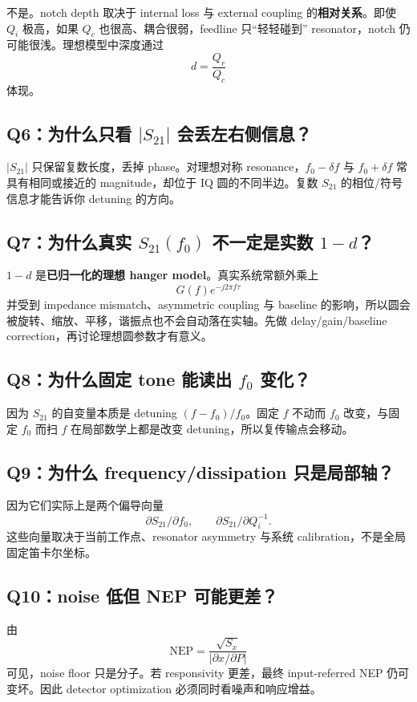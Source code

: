 \documentclass[11pt,a4paper,openany]{ctexrep}
\begin{document}
不是。notch depth 取决于 internal loss 与 external coupling 的\textbf{相对关系}。即使 $Q_i$ 极高，如果 $Q_c$ 也很高、耦合很弱，feedline 只“轻轻碰到” resonator，notch 仍可能很浅。理想模型中深度通过
\[
d=\frac{Q_r}{Q_c}
\]
体现。

\subsection*{Q6：为什么只看 $|S_{21}|$ 会丢左右侧信息？}

$|S_{21}|$ 只保留复数长度，丢掉 phase。对理想对称 resonance，$f_0-\delta f$ 与 $f_0+\delta f$ 常具有相同或接近的 magnitude，却位于 IQ 圆的不同半边。复数 $S_{21}$ 的相位/符号信息才能告诉你 detuning 的方向。

\subsection*{Q7：为什么真实 $S_{21}(f_0)$ 不一定是实数 $1-d$？}

$1-d$ 是\textbf{已归一化的理想 hanger model}。真实系统常额外乘上
\[
G(f)e^{-j2\pi f\tau}
\]
并受到 impedance mismatch、asymmetric coupling 与 baseline 的影响，所以圆会被旋转、缩放、平移，谐振点也不会自动落在实轴。先做 delay/gain/baseline correction，再讨论理想圆参数才有意义。

\subsection*{Q8：为什么固定 tone 能读出 $f_0$ 变化？}

因为 $S_{21}$ 的自变量本质是 detuning $(f-f_0)/f_0$。固定 $f$ 不动而 $f_0$ 改变，与固定 $f_0$ 而扫 $f$ 在局部数学上都是改变 detuning，所以复传输点会移动。

\subsection*{Q9：为什么 frequency/dissipation 只是局部轴？}

因为它们实际上是两个偏导向量
\[
\partial S_{21}/\partial f_0,
\qquad
\partial S_{21}/\partial Q_i^{-1}.
\]
这些向量取决于当前工作点、resonator asymmetry 与系统 calibration，不是全局固定笛卡尔坐标。

\subsection*{Q10：noise 低但 NEP 可能更差？}

由
\[
\mathrm{NEP}=\frac{\sqrt{S_x}}{|\partial x/\partial P|}
\]
可见，noise floor 只是分子。若 responsivity 更差，最终 input-referred NEP 仍可变坏。因此 detector optimization 必须同时看噪声和响应增益。
\end{document}
